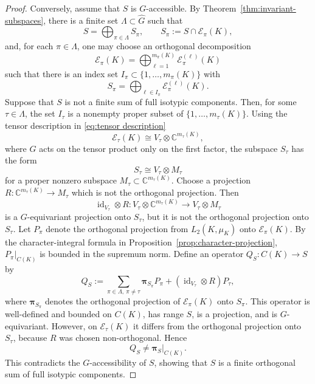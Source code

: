 \documentclass[11pt,showkeys]{amsart}
\begin{document}
\begin{proof}
Conversely, assume that \(S\) is \(G\)-accessible. By
Theorem~\ref{thm:invariant-subspaces}, there is a finite set
\(\Lambda\subset\widehat G\) such that
\[
        S=
        \bigoplus_{\pi\in\Lambda} S_\pi,
        \qquad
        S_\pi:=S\cap\mathcal E_\pi(K),
\]
and, for each \(\pi\in\Lambda\), one may choose an orthogonal decomposition
\[
        \mathcal E_\pi(K)
        =
        \bigoplus_{\ell=1}^{m_\pi(K)}
        \mathcal E_\pi^{(\ell)}(K)
\]
such that there is an index set
\(I_\pi\subset\{1,\ldots,m_\pi(K)\}\) with
\[
        S_\pi
        =
        \bigoplus_{\ell\in I_\pi}
        \mathcal E_\pi^{(\ell)}(K).
\]
Suppose that \(S\) is not a finite sum of full isotypic components. Then,
for some \(\tau\in\Lambda\), the set \(I_\tau\) is a nonempty proper
subset of \(\{1,\ldots,m_\tau(K)\}\). Using the tensor description in \eqref{eq:tensor description}
\[
        \mathcal E_\tau(K)
        \cong
        V_\tau\otimes \mathbb C^{m_\tau(K)},
\]
where \(G\) acts on the tensor product only on the first factor, the
subspace \(S_\tau\) has the form
\[
        S_\tau
        \cong
        V_\tau\otimes M_\tau
\]
for a proper nonzero subspace
\(M_\tau\subset\mathbb C^{m_\tau(K)}\).
Choose a projection
\(
        R:\mathbb C^{m_\tau(K)}\longrightarrow M_\tau
\)
which is not the orthogonal projection. Then
\[
        \operatorname{id}_{V_\tau}\otimes R
        :
        V_\tau\otimes \mathbb C^{m_\tau(K)}
        \longrightarrow
        V_\tau\otimes M_\tau
\]
is a \(G\)-equivariant projection onto \(S_\tau\), but it is not the
orthogonal projection onto \(S_\tau\).
Let \(P_\pi\) denote the orthogonal projection from \(L_2(K,\mu_K)\) onto
\(\mathcal E_\pi(K)\). By the character-integral formula in Proposition~\ref{prop:character-projection},
\(P_\pi|_{C(K)}\) is bounded in the supremum norm.  Define an operator
\(
        Q_S:C(K)\longrightarrow S
\)
by
\[
        Q_S
        :=
        \sum_{\pi\in\Lambda,\ \pi\neq\tau}
        \mathbf \pi_{S_\pi} P_\pi
        +
        (\operatorname{id}_{V_\tau}\otimes R) P_\tau ,
\]
where \(\mathbf \pi_{S_\pi}\) denotes the orthogonal projection of
\(\mathcal E_\pi(K)\) onto \(S_\pi\). This operator is well-defined and
bounded on \(C(K)\), has range \(S\), is a projection, and is
\(G\)-equivariant. However, on \(\mathcal E_\tau(K)\) it differs from the
orthogonal projection onto \(S_\tau\), because \(R\) was chosen
non-orthogonal. Hence
\[
        Q_S\neq \mathbf \pi_S|_{C(K)}.
\]
This contradicts the \(G\)-accessibility of \(S\), showing that \(S\) is
a finite orthogonal sum of full isotypic components.
\end{proof}
\end{document}

